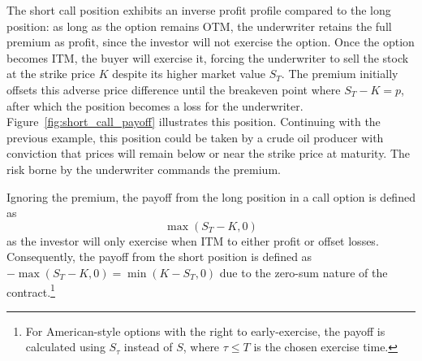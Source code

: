 \documentclass[english,12pt,a4paper,pdftex,sci,utf8]{aaltothesis}
\begin{document}
The short call position exhibits an inverse profit profile compared to the long position: as long as the option remains OTM, the underwriter retains the full premium as profit, since the investor will not exercise the option. Once the option becomes ITM, the buyer will exercise it, forcing the underwriter to sell the stock at the strike price $K$ despite its higher market value $S_T$. The premium initially offsets this adverse price difference until the breakeven point where $S_T-K=p$, after which the position becomes a loss for the underwriter. Figure~\ref{fig:short_call_payoff} illustrates this position. Continuing with the previous example, this position could be taken by a crude oil producer with conviction that prices will remain below or near the strike price at maturity. The risk borne by the underwriter commands the premium.

Ignoring the premium, the payoff from the long position in a call option is defined as
\begin{equation}
    \max(S_T-K,0)
\end{equation}
as the investor will only exercise when ITM to either profit or offset losses. Consequently, the payoff from the short position is defined as $-\max(S_T-K,0) = \min(K-S_T,0)$ due to the zero-sum nature of the contract.\footnote{For American-style options with the right to early-exercise, the payoff is calculated using $S_\tau$ instead of $S$, where $\tau \le T$ is the chosen exercise time.}\cite{hull2016options}
\end{document}
